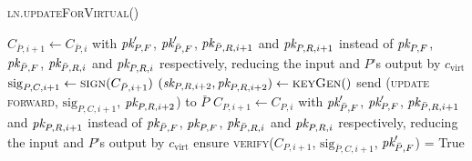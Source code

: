 \begin{center}
  \begin{processbox}{\textsc{ln}.\textsc{updateForVirtual}()}
    \ \\
    \begin{algorithmic}[1]
      \State $C_{\bar{P}, i+1} \gets C_{\bar{P}, i}$ with $\textit{pk}_{P, F}'$,
      $\textit{pk}_{\bar{P}, F}'$, $\textit{pk}_{\bar{P}, R, i+1}$ and $\textit{pk}_{P, R, i+1}$ instead of
      $\textit{pk}_{P, F}$, $\textit{pk}_{\bar{P}, F}$, $\textit{pk}_{\bar{P}, R, i}$ and $\textit{pk}_{P, R, i}$
      respectively, reducing the input and $P$'s output by $c_{\mathrm{virt}}$
      \State $\mathrm{sig}_{P, C, i+1} \gets \textsc{sign}(C_{\bar{P}, i+1})$
      \State $(\textit{sk}_{P, R, i+2}, \textit{pk}_{P, R, i+2}) \gets \textsc{keyGen}()$
      \State send (\textsc{update forward}, $\mathrm{sig}_{P, C, i+1}$, $\textit{pk}_{P,
      R, i+2}$) to $\bar{P}$
      \State {}
      \State {}
      \State {}
      \State {}
      \State {} 
      \State {}
      \State {}
      \State $C_{P, i+1} \gets C_{P, i}$ with $\textit{pk}_{\bar{P}, F}'$, $\textit{pk}_{P, F}'$,
      $\textit{pk}_{\bar{P}, R, i+1}$ and $\textit{pk}_{P, R, i+1}$ instead of $\textit{pk}_{\bar{P}, F}$,
      $\textit{pk}_{P, F}$, $\textit{pk}_{\bar{P}, R, i}$ and $\textit{pk}_{P, R, i}$ respectively,
      reducing the input and $P$'s output by $c_{\mathrm{virt}}$
      \State ensure \textsc{verify}($C_{P, i+1}$, $\mathrm{sig}_{\bar{P}, C,
      i+1}$, $\textit{pk}_{\bar{P}, F}'$) = True
    \end{algorithmic}
  \end{processbox}
  \label{code:ln:open:virtual-update}
\end{center} \ \\

